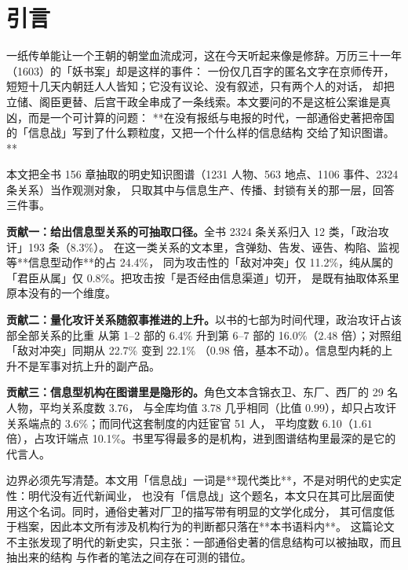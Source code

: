 \section{引言}

一纸传单能让一个王朝的朝堂血流成河，这在今天听起来像是修辞。万历三十一年（1603）的「妖书案」却是这样的事件：
一份仅几百字的匿名文字在京师传开，短短十几天内朝廷人人皆知；它没有议论、没有叙述，只有两个人的对话，
却把立储、阁臣更替、后宫干政全串成了一条线索。本文要问的不是这桩公案谁是真凶，而是一个可计算的问题：
**在没有报纸与电报的时代，一部通俗史著把帝国的「信息战」写到了什么颗粒度，又把一个什么样的信息结构
交给了知识图谱。**

本文把全书 156 章抽取的明史知识图谱（1231 人物、563 地点、1106 事件、2324 条关系）当作观测对象，
只取其中与信息生产、传播、封锁有关的那一层，回答三件事。

\textbf{贡献一：给出信息型关系的可抽取口径。}全书 2324 条关系归入 12 类，「政治攻讦」193 条（8.3\%）。
在这一类关系的文本里，含弹劾、告发、诬告、构陷、监视等**信息型动作**的占 24.4\%，
同为攻击性的「敌对冲突」仅 11.2\%，纯从属的「君臣从属」仅 0.8\%。把攻击按「是否经由信息渠道」切开，
是既有抽取体系里原本没有的一个维度。

\textbf{贡献二：量化攻讦关系随叙事推进的上升。}以书的七部为时间代理，政治攻讦占该部全部关系的比重
从第 1--2 部的 6.4\% 升到第 6--7 部的 16.0\%（$2.48$ 倍）；对照组「敌对冲突」同期从 22.7\% 变到 22.1\%
（$0.98$ 倍，基本不动）。信息型内耗的上升不是军事对抗上升的副产品。

\textbf{贡献三：信息型机构在图谱里是隐形的。}角色文本含锦衣卫、东厂、西厂的 29 名人物，平均关系度数 3.76，
与全库均值 3.78 几乎相同（比值 $0.99$），却只占攻讦关系端点的 3.6\%；而同代这套制度的内廷宦官 51 人，
平均度数 6.10（$1.61$ 倍），占攻讦端点 10.1\%。书里写得最多的是机构，进到图谱结构里最深的是它的代言人。

边界必须先写清楚。本文用「信息战」一词是**现代类比**，不是对明代的史实定性：明代没有近代新闻业，
也没有「信息战」这个题名，本文只在其可比层面使用这个名词。同时，通俗史著对厂卫的描写带有明显的文学化成分，
其可信度低于档案，因此本文所有涉及机构行为的判断都只落在**本书语料内**。
这篇论文不主张发现了明代的新史实，只主张：一部通俗史著的信息结构可以被抽取，而且抽出来的结构
与作者的笔法之间存在可测的错位。
